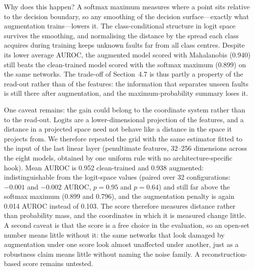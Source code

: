 Why does this happen? A softmax maximum measures where a point sits relative to the decision boundary, so any smoothing of the decision surface---exactly what augmentation trains---lowers it. The class-conditional structure in logit space survives the smoothing, and normalising the distance by the spread each class acquires during training keeps unknown faults far from all class centres. Despite its lower average AUROC, the augmented model scored with Mahalanobis (0.940) still beats the clean-trained model scored with the softmax maximum (0.899) on the same networks. The trade-off of Section~4.7 is thus partly a property of the read-out rather than of the features: the information that separates unseen faults is still there after augmentation, and the maximum-probability summary loses it.

One caveat remains: the gain could belong to the coordinate system rather than to the read-out. Logits are a lower-dimensional projection of the features, and a distance in a projected space need not behave like a distance in the space it projects from. We therefore repeated the grid with the same estimator fitted to the input of the last linear layer (penultimate features, 32--256 dimensions across the eight models, obtained by one uniform rule with no architecture-specific hook). Mean AUROC is 0.952 clean-trained and 0.938 augmented: indistinguishable from the logit-space values (paired over 32 configurations: $-0.001$ and $-0.002$ AUROC, $p = 0.95$ and $p = 0.64$) and still far above the softmax maximum (0.899 and 0.796), and the augmentation penalty is again 0.014 AUROC instead of 0.103. The score therefore measures distance rather than probability mass, and the coordinates in which it is measured change little. A second caveat is that the score is a free choice in the evaluation, so an open-set number means little without it: the same networks that look damaged by augmentation under one score look almost unaffected under another, just as a robustness claim means little without naming the noise family. A reconstruction-based score remains untested.

